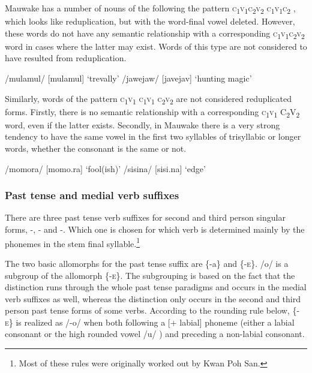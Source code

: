 Mauwake has a number of nouns of the following the pattern \textsc{c}\textsubscript{1}\textsc{v}\textsubscript{1}\textsc{c}\textsubscript{2}\textsc{v}\textsubscript{2} \textsc{c}\textsubscript{1}\textsc{v}\textsubscript{1}\textsc{c}\textsubscript{2} , which looks like reduplication, but with the word-final vowel deleted.  However, these words do not have any semantic relationship with a corresponding \textsc{c}\textsubscript{1}\textsc{v}\textsubscript{1}\textsc{c}\textsubscript{2}\textsc{v}\textsubscript{2} word in cases where the latter may exist.  Words of this type are not considered to have resulted from reduplication.

\ea
\ea
/mulamul/  [mu{{\textprimstress}lamul}]  `trevally'
\ex
/jawejaw/  [ja{{\textprimstress}vejav}]  `hunting magic'
\z
\z

Similarly, words of the pattern \textsc{c}\textsubscript{1}\textsc{v}\textsubscript{1} \textsc{c}\textsubscript{1}\textsc{v}\textsubscript{1} \textsc{c}\textsubscript{2}\textsc{v}\textsubscript{2} are not considered reduplicated forms.  Firstly, there is no semantic relationship with a corresponding \textsc{c}\textsubscript{1}\textsc{v}\textsubscript{1} C\textsubscript{2}V\textsubscript{2} word, even if the latter exists. Secondly, in Mauwake there is a very strong tendency to have the same vowel in the first two syllables of trisyllabic or longer words, whether the consonant is the same or not. 

\ea
\ea
/momora/  [mo{{\textprimstress}mo.ra}]  `fool(ish)'
\ex
/sisina/  [si{{\textprimstress}si.na}]  `edge'
\z
\z

\subsubsection{Past tense and medial verb suffixes}\label{sec:2.3.3.3}


There are three past tense verb suffixes for second and third person singular forms, -, - and -.  Which one is chosen for which verb is determined mainly by the phonemes in the stem final syllable.\footnote{Most of these rules were originally worked out by Kwan Poh San.}

The two basic allomorphs for the past tense suffix are \{-a\} and \{-\textsc{e}\}. /\textstyleStyleVernacularWordsItalic{-}o/ is a subgroup of the allomorph \{-\textsc{e}\}. The subgrouping is based on the fact that the  distinction runs through the whole past tense paradigms and occurs in the medial verb suffixes as well, whereas the \textstyleStyleVernacularWordsItalic{-} distinction only occurs in the second and third person past tense forms of some verbs.  According to the rounding rule below, \{-\textsc{e}\} is realized as /-o/ when both following a [+ labial] phoneme (either a labial consonant or the high rounded vowel /u/ ) and preceding a non-labial consonant. 

